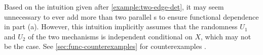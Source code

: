 Based on the intuition given after \cref{example:two-edge-det}, it may seem unnecessary to ever add more than two parallel \hyperarc s to ensure functional dependence in part (a). 
However, this intuition implicitly assumes that the randomness $U_1$ and $U_2$ of the two mechanisms is independent conditional on $X$,
which may not be the case.
See \cref{sec:func-counterexamples} for counterexamples
\unskip.



